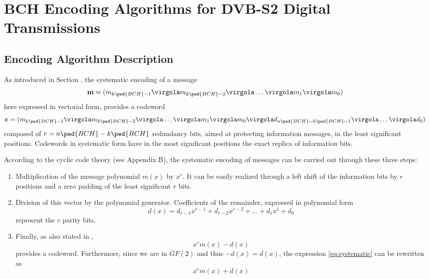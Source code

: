 

\chapter{BCH Encoding Algorithms for DVB-S2 Digital Transmissions} \label{ch:BCHAlg&Arch}


\section{Encoding Algorithm Description}

As introduced in Section , the systematic encoding of a message
\begin{equation}
 \vet m = (m_{k\ped{BCH}-1} \virgola m_{k\ped{BCH}-2} \virgola \ldots  \virgola m_{1} \virgola m_{0})
\end{equation}
here expressed in vectorial form, provides a codeword
\begin{equation}
\vet c = (m_{k\ped{BCH}-1} \virgola m_{k\ped{BCH}-2} \virgola \ldots  \virgola m_{1} \virgola m_{0} \virgola d_{n\ped{BCH}-k\ped{BCH}-1} \virgola \ldots \virgola d_0)
\end{equation} \label{eq:codsyst}
composed of \(r=n\ped{BCH}-k\ped{BCH}\) redundancy bits, aimed at protecting information messages, in the least significant positions. Codewords in systematic form have in the most significant positions the exact replica of information bits.

According to the cyclic code theory (see Appendix B), the systematic encoding of messages can be carried out through these three steps:
\begin{enumerate}
\item Multiplication of the message polynomial $m(x)$ by $x^r$. It can be easily realized through a left shift of the information bits by $r$ positions and a zero padding of the least significant $r$ bits.
\item Division of this vector by the polynomial generator. Coefficients of the remainder, expressed in polynomial form
    \begin{equation}
    d(x) = d_{r-1}x^{r-1} +  d_{r-2}x^{r-2} + \ldots+ d_1 x^1 + d_0 \label{eq:remainder}
    \end{equation}
    represent the \(r\) parity bits.
\item Finally, as also stated in ,
\begin{equation} \label{eq:systematic}
 x^{r}m(x)-d(x)
\end{equation}
provides a codeword. Furthermore, since we are in $GF(2)$ and thus $-d(x) = d(x)$, the expression \eqref{eq:systematic} can be rewritten as
\begin{equation}
 x^{r}m(x)+d(x) \label{eq:sistematica}
\end{equation}
\end{enumerate}

